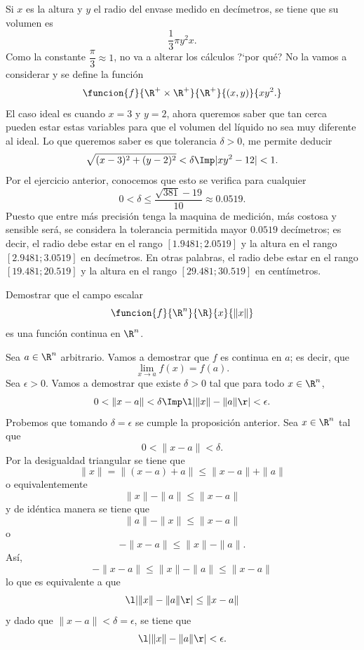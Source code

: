 \documentclass[a4,11pt]{aleph-examen}
\begin{document}
\begin{preguntas}
\begin{respuesta}
\begin{respuesta}
    Si $x$ es la altura y $y$ el radio del envase medido en decímetros, se tiene que su volumen es
    \[
        \dfrac{1}{3}\pi y^2 x.        
    \]
    Como la constante $\dfrac{\pi}{3}\approx 1$, no va a alterar los cálculos ?`por qué? No la vamos a considerar y se define la función
    \[
        \funcion{f}{\R^+\times \R^+}{\R^+}{(x,y)}{xy^2.}
    \]
    El caso ideal es cuando $x=3$ y $y=2$, ahora queremos saber que tan cerca pueden estar estas variables para que el volumen del líquido no sea muy diferente al ideal. Lo que queremos saber es que tolerancia $\delta >0$, me permite deducir
    \[
        \sqrt{(x-3)^2+(y-2)^2}<\delta \Imp |xy^2-12|<1.
    \]
    Por el ejercicio anterior, conocemos que esto se verifica para cualquier
    \[
        0<\delta \leq \dfrac{ \sqrt{381} - 19}{10}\approx 0.0519.
    \]
    Puesto que entre más precisión tenga la maquina de medición, más costosa y sensible será, se considera la tolerancia permitida mayor $0.0519$ decímetros; es decir, el radio debe estar en el rango $[1.9481;2.0519]$ y la altura en el rango $[2.9481;3.0519]$ en decímetros. En otras palabras, el radio debe estar en el rango $[19.481;20.519]$ y la altura en el rango $[29.481;30.519]$ en centímetros.   
\end{respuesta}

\item
	Demostrar que el campo escalar
	\[
		\funcion{f}{\R^n}{\R}{x}{\|x\|}
	\]
	es una función continua en $\R^n$.

\begin{respuesta}
	Sea $a\in\R^n$ arbitrario. Vamos a demostrar que $f$ es continua en $a$; es decir, que
	\[
		\lim_{x\to a}f(x)=f(a).
	\]
	Sea $\epsilon>0$. Vamos a demostrar que existe $\delta>0$ tal que para todo $x\in\R^n$,
	\[
		0<\|x-a\|<\delta \Imp \l|\|x\|-\|a\|\r|<\epsilon.
	\]
	Probemos que tomando $\delta =\epsilon$ se cumple la proposición anterior. Sea $x\in\R^n$ tal que
	\[
		0<\|x-a\|<\delta.
	\]
	Por la desigualdad triangular se tiene que
	\[
		\|x\|=\|(x-a)+a\|\leq\|x-a\|+\|a\|
	\]
	o equivalentemente 
	\[
		\|x\|-\|a\|\leq \|x-a\|
	\]
	y de idéntica manera se tiene que
	\[
		\|a\|-\|x\|\leq \|x-a\|
	\]
	o
	\[
		-\|x-a\|\leq \|x\|-\|a\|.
	\]
	Así,
	\[
		-\|x-a\|\leq \|x\|-\|a\|\leq \|x-a\|
	\]
	lo que es equivalente a que
	\[
		\l|\|x\|-\|a\|\r|\leq \|x-a\|
	\]
	y dado que $\|x-a\|<\delta=\epsilon$, se tiene que
	\[
		\l|\|x\|-\|a\|\r|<\epsilon.
	\]
\end{respuesta}


\end{respuesta}
\end{preguntas}
\end{document}

